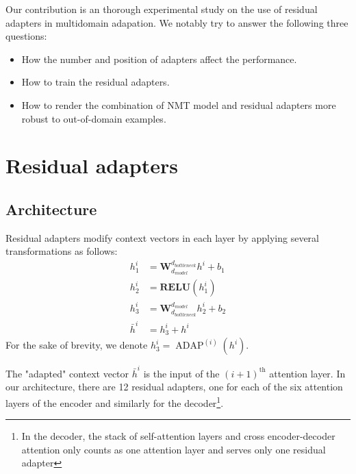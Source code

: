 \documentclass[11pt,a4paper]{article}
\newcommand{\fyTodo}[1]{\Todo[FY:]{\textcolor{orange}{#1}}}
\newcommand{\fyDone}[1]{\done[FY]\Todo[FY:]{\textcolor{orange}{#1}}}
\begin{document}
Our contribution is an thorough experimental study on the use of residual adapters in multidomain adapation. We notably try to answer the following three questions:
\begin{itemize}
\item How the number and position of adapters affect the performance.
\item How to train the residual adapters.
\item How to render the combination of NMT model and residual adapters more robust to out-of-domain examples.
\end{itemize}
\fyTodo{One bit of a conclusion here}

\section{Residual adapters \label{sec:res}}

\subsection{Architecture \label{ssec:architecture}}
\fyTodo{More contexts and notations from the transformer}

Residual adapters modify context vectors in each layer by applying several transformations as follows:\fyTodo{Use align env}
\begin{align*}
  h^{i}_1 &= \mathbf{W}_{d_{model}}^{d_{bottleneck}}h^{i} + b_{1} \\
  h^{i}_2 &= \mathbf{RELU}(h_1^{i}) \\
  h^{i}_3 &= \mathbf{W}_{d_{bottleneck}}^{d_{model}}h_2^{i} + b_{2} \\
  \bar{h}^{i} &= h^{i}_3 + h^i
\end{align*}
For the sake of brevity, we denote $h^i_3 = \operatorname{ADAP}^{(i)}(h^i)$.\fyDone{or is it $h_i$ ?}\fyTodo{attention aux matrices $W_i$}

The "adapted" context vector $\bar{h}^i$ is the input of the $(i+1)^{\text{th}}$ attention\fyDone{Self attention ?} layer. In our architecture, there are 12 residual adapters, one for each of the six attention layers of the encoder and similarly for the decoder\footnote{In the decoder, the stack of self-attention layers and cross encoder-decoder attention only counts as one attention layer and serves only one residual adapter}.
\end{document}
